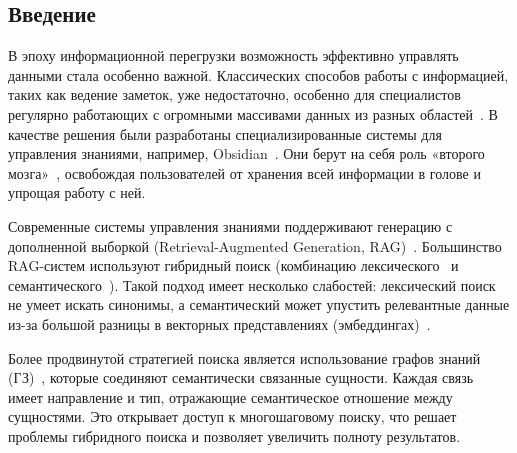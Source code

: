 \clearpage



\begin{center}
    \section*{Введение}
\end{center}


В эпоху информационной перегрузки
возможность эффективно управлять данными
стала особенно важной.
Классических способов работы с информацией,
таких как ведение заметок,
уже недостаточно,
особенно для специалистов
регулярно работающих с огромными массивами
данных из разных областей~\cite{Ahrens_2017}.
В качестве решения были разработаны специализированные системы
для управления знаниями, например, Obsidian~\cite{Obsidian}.
Они берут на себя роль «второго мозга»~\cite{Forte_2022},
освобождая пользователей от хранения всей информации в голове
и упрощая работу с ней.

Современные системы управления знаниями поддерживают
генерацию с дополненной выборкой (Retrieval-Augmented Generation, RAG)~\cite{Lewis_2020}.
Большинство RAG-систем используют гибридный поиск
(комбинацию лексического~\cite{Robertson_2009} и семантического~\cite{Karpukhin_2020}).
Такой подход имеет несколько слабостей:
лексический поиск не умеет искать синонимы,
а семантический может упустить релевантные данные из-за большой разницы
в векторных представлениях (эмбеддингах)~\cite{Gao_2023}.

Более продвинутой стратегией поиска является
использование графов знаний (ГЗ)~\cite{Edge_2024},
которые соединяют семантически связанные сущности.
Каждая связь имеет направление и тип,
отражающие семантическое отношение между сущностями.
Это открывает доступ к многошаговому поиску,
что решает проблемы гибридного поиска и
позволяет увеличить полноту результатов.

